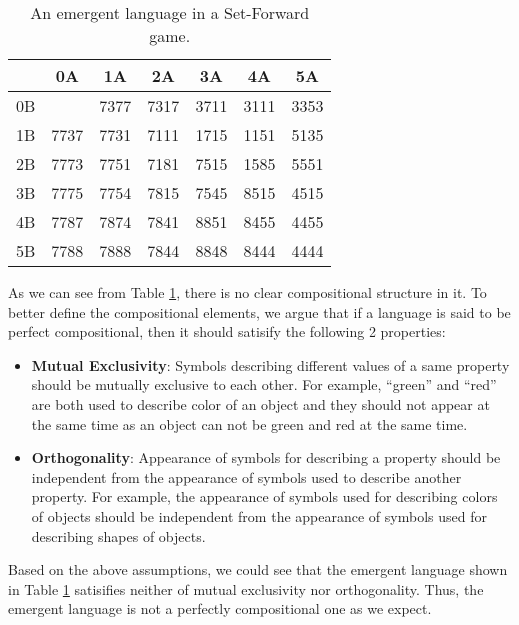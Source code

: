 \begin{table}[!h]
    \centering
    \begin{tabular}{|c|c|c|c|c|c|c|}
        \hline
           & 0A   & 1A   & 2A   & 3A   & 4A   & 5A   \\ \hline
        0B &      & 7377 & 7317 & 3711 & 3111 & 3353 \\ \hline
        1B & 7737 & 7731 & 7111 & 1715 & 1151 & 5135 \\ \hline
        2B & 7773 & 7751 & 7181 & 7515 & 1585 & 5551 \\ \hline
        3B & 7775 & 7754 & 7815 & 7545 & 8515 & 4515 \\ \hline
        4B & 7787 & 7874 & 7841 & 8851 & 8455 & 4455 \\ \hline
        5B & 7788 & 7888 & 7844 & 8848 & 8444 & 4444 \\ \hline
        \end{tabular}
    \caption{An emergent language in a Set-Forward game.}
    \label{tab4.2:emregent_langauge_generation}
\end{table}

As we can see from Table \ref{tab4.2:emregent_langauge_generation}, there is no clear compositional structure in it. To better define the compositional elements, we argue that if a language is said to be perfect compositional, then it should satisify the following 2 properties:

\begin{itemize}
    \item \textbf{Mutual Exclusivity}: Symbols describing different values of a same property should be mutually exclusive to each other. For example, ``green'' and ``red'' are both used to describe color of an object and they should not appear at the same time as an object can not be green and red at the same time.
    \item \textbf{Orthogonality}: Appearance of symbols for describing a property should be independent from the appearance of symbols used to describe another property. For example, the appearance of symbols used for describing colors of objects should be independent from the appearance of symbols used for describing shapes of objects.
\end{itemize}

Based on the above assumptions, we could see that the emergent language shown in Table \ref{tab4.2:emregent_langauge_generation} satisifies neither of mutual exclusivity nor orthogonality. Thus, the emergent language is not a perfectly compositional one as we expect.

